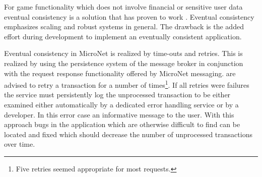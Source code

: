 For game functionality which does not involve financial or sensitive user data
eventual consistency is a solution that has proven to work
\cite{graham2016distributed_transactions}. Eventual consistency emphasizes
scaling and robust systems in general. The drawback is the added effort during
development to implement an eventually consistent application.

Eventual consistency in MicroNet is realized by time-outs and retries. This is
realized by using the persistence system of the message broker in conjunction
with the request response functionality offered by MicroNet messaging. \mssuc{}
are advised to retry a transaction for a number of times\footnote{Five retries
seemed appropriate for most requests.}. If all retries were failures the service
must persistently log the unprocessed transaction to be either examined either
automatically by a dedicated error handling service or by a developer. In this
error case an informative message to the user. With this approach bugs in the
application which are otherwise difficult to find can be located and fixed which
should decrease the number of unprocessed transactions over time.
